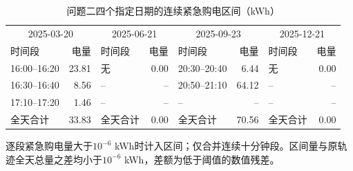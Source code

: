 \begin{table}[htbp]\centering\small
\caption{问题二四个指定日期的连续紧急购电区间（kWh）}\label{tab:q2-emergency}
\setlength{\tabcolsep}{3pt}
\begin{tabular}{lrlrlrlr}\toprule
\multicolumn{2}{c}{2025-03-20} & \multicolumn{2}{c}{2025-06-21} & \multicolumn{2}{c}{2025-09-23} & \multicolumn{2}{c}{2025-12-21} \\
时间段 & 电量 & 时间段 & 电量 & 时间段 & 电量 & 时间段 & 电量 \\\midrule
16:00--16:20 & 23.81 & 无 & 0.00 & 20:30--20:40 & 6.44 & 无 & 0.00 \\
16:30--16:40 & 8.56 & -- & -- & 20:50--21:10 & 64.12 & -- & -- \\
17:10--17:20 & 1.46 & -- & -- & -- & -- & -- & -- \\
\midrule
全天合计 & 33.83 & 全天合计 & 0.00 & 全天合计 & 70.56 & 全天合计 & 0.00 \\
\bottomrule\end{tabular}
\par\vspace{1mm}\begin{minipage}{.97\linewidth}\footnotesize
逐段紧急购电量大于$10^{-6}$ kWh时计入区间；仅合并连续十分钟段。区间量与原轨迹全天总量之差均小于$10^{-6}$ kWh，差额为低于阈值的数值残差。
\end{minipage}\end{table}
